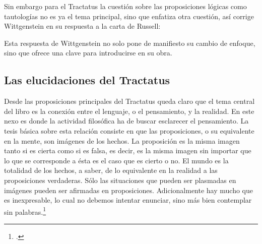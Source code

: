 Sin embargo para el Tractatus la cuestión sobre las proposiciones lógicas como
tautologías no es ya el tema principal, sino que enfatiza otra cuestión, así
corrige Wittgenstein en su respuesta a la carta de Russell:

Esta respuesta de Wittgenstein no solo pone de manifiesto su cambio de enfoque,
sino que ofrece una clave para introducirse en su obra. 


\subsection{Las elucidaciones del Tractatus}
Desde las proposiciones principales del Tractatus queda claro que el tema
central del libro es la conexión entre el lenguaje, o el pensamiento, y la
realidad.  
En este nexo es donde la actividad filosófica ha de buscar esclarecer el
pensamiento.
La tesis básica sobre esta relación consiste en que las proposiciones, o su
equivalente en la mente, son imágenes de los hechos.
La proposición es la misma imagen tanto si es cierta como si es falsa, es decir,
es la misma imagen sin importar que lo que se corresponde a ésta es el caso que
es cierto o no. El mundo es la totalidad de los hechos, a saber, de lo
equivalente en la realidad a las proposiciones verdaderas.
Sólo las situaciones que pueden ser plasmadas en imágenes pueden ser afirmadas
en proposiciones. Adicionalmente hay mucho que es inexpresable, lo cual no
debemos intentar enunciar, sino más bien contemplar sin palabras.\footcite[cf.
p.19]{IWT}

